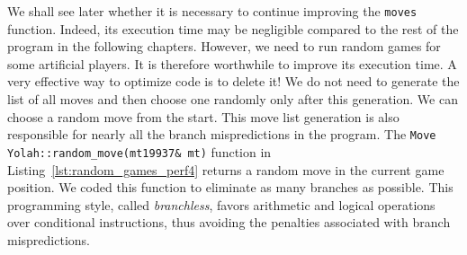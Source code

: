 \documentclass[12pt,a4paper,twoside,openright]{book}
\begin{document}
We shall see later whether it is necessary to continue improving the \texttt{moves} function. Indeed, its execution time may be negligible compared to the rest of the program in the following chapters. However, we need to run random games for some artificial players. It is therefore worthwhile to improve its execution time. A very effective way to optimize code is to delete it! We do not need to generate the list of all moves and then choose one randomly only after this generation. We can choose a random move from the start. This move list generation is also responsible for nearly all the branch mispredictions in the program. The \texttt{Move Yolah::random_move(mt19937& mt)} function in Listing~\ref{lst:random_games_perf4} returns a random move in the current game position. We coded this function to eliminate as many branches as possible. This programming style, called \emph{branchless}, favors arithmetic and logical operations over conditional instructions, thus avoiding the penalties associated with branch mispredictions.
\end{document}
